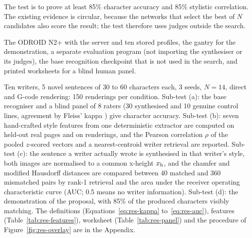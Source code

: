 
\medskip
\label{sec:res-qtp1}


            The test is to prove at least 85\% character accuracy and 85\% stylistic correlation.
            The existing evidence is circular, because the networks that select the best of $N$ candidates also score the result; the test therefore uses judges outside the search.


            The ODROID N2+ with the server and ten stored profiles, the gantry for the demonstration, a separate evaluation program (not importing the synthesiser or its judges), the base recognition checkpoint that is not used in the search, and printed worksheets for a blind human panel.


            Ten writers, 5 novel sentences of 30 to 60 characters each, 3 seeds, $N=14$, direct and G-code rendering: 150 renderings per condition.
            Sub-test (a): the base recogniser and a blind panel of 8 raters (30 synthesised and 10 genuine control lines, agreement by Fleiss' kappa \cite{fleiss1971}) give character accuracy.
            Sub-test (b): seven hand-crafted style features from one deterministic extractor are computed on held-out real pages and on renderings, and the Pearson correlation $\rho$ of the pooled $z$-scored vectors and a nearest-centroid writer retrieval are reported.
            Sub-test (c): the sentence a writer actually wrote is synthesised in that writer's style, both images are normalised to a common x-height $x_{\mathrm{h}}$, and the chamfer and modified Hausdorff distances \cite{dubuisson1994} are compared between 40 matched and 360 mismatched pairs by rank-1 retrieval and the area under the receiver operating characteristic curve (AUC; 0.5 means no writer information).
            Sub-test (d): the demonstration of the proposal, with 85\% of the produced characters visibly matching.
            The definitions (Equations~\ref{eq:res-kappa} to~\ref{eq:res-auc}), features (Table~\ref{tab:res-features}), worksheet (Table~\ref{tab:res-panel}) and the procedure of Figure~\ref{fig:res-overlay} are in the Appendix.

